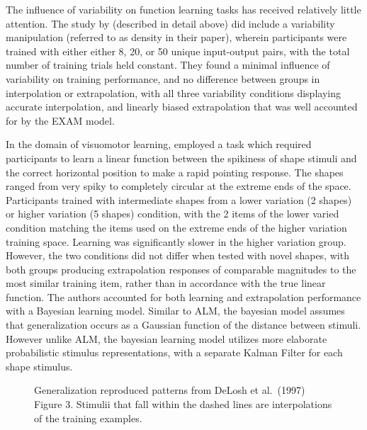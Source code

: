 \documentclass[
  12pt,
  letterpaper,
]{article}
\begin{document}
The influence of variability on function learning tasks has received
relatively little attention. The study by
\textcite{deloshExtrapolationSineQua1997} (described in detail above)
did include a variability manipulation (referred to as density in their
paper), wherein participants were trained with either either 8, 20, or
50 unique input-output pairs, with the total number of training trials
held constant. They found a minimal influence of variability on training
performance, and no difference between groups in interpolation or
extrapolation, with all three variability conditions displaying accurate
interpolation, and linearly biased extrapolation that was well accounted
for by the EXAM model.

In the domain of visuomotor learning,
\textcite{vandamMappingShapeVisuomotor2015} employed a task which
required participants to learn a linear function between the spikiness
of shape stimuli and the correct horizontal position to make a rapid
pointing response. The shapes ranged from very spiky to completely
circular at the extreme ends of the space. Participants trained with
intermediate shapes from a lower variation (2 shapes) or higher
variation (5 shapes) condition, with the 2 items of the lower varied
condition matching the items used on the extreme ends of the higher
variation training space. Learning was significantly slower in the
higher variation group. However, the two conditions did not differ when
tested with novel shapes, with both groups producing extrapolation
responses of comparable magnitudes to the most similar training item,
rather than in accordance with the true linear function. The authors
accounted for both learning and extrapolation performance with a
Bayesian learning model. Similar to ALM, the bayesian model assumes that
generalization occurs as a Gaussian function of the distance between
stimuli. However unlike ALM, the bayesian learning model utilizes more
elaborate probabilistic stimulus representations, with a separate Kalman
Filter for each shape stimulus.

\begin{figure}


\caption{\label{fig-delosh-extrap}Generalization reproduced patterns
from DeLosh et al.~(1997) Figure 3. Stimulii that fall within the dashed
lines are interpolations of the training examples.}

\end{figure}%
\end{document}
